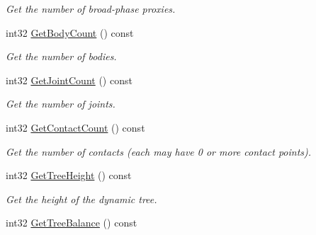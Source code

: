 \begin{DoxyCompactItemize}
\begin{DoxyCompactList}\small\item\em Get the number of broad-\/phase proxies. \end{DoxyCompactList}\item 
int32 \hyperlink{classb2_world_a4559122ea51401b4fb7342eb6232ce74}{Get\+Body\+Count} () const \hypertarget{classb2_world_a4559122ea51401b4fb7342eb6232ce74}{}\label{classb2_world_a4559122ea51401b4fb7342eb6232ce74}

\begin{DoxyCompactList}\small\item\em Get the number of bodies. \end{DoxyCompactList}\item 
int32 \hyperlink{classb2_world_a54a95a98787ed5f383c6549ee1f4c4d5}{Get\+Joint\+Count} () const \hypertarget{classb2_world_a54a95a98787ed5f383c6549ee1f4c4d5}{}\label{classb2_world_a54a95a98787ed5f383c6549ee1f4c4d5}

\begin{DoxyCompactList}\small\item\em Get the number of joints. \end{DoxyCompactList}\item 
int32 \hyperlink{classb2_world_abcc976f1755f9bb94a8650f5f4219a8d}{Get\+Contact\+Count} () const \hypertarget{classb2_world_abcc976f1755f9bb94a8650f5f4219a8d}{}\label{classb2_world_abcc976f1755f9bb94a8650f5f4219a8d}

\begin{DoxyCompactList}\small\item\em Get the number of contacts (each may have 0 or more contact points). \end{DoxyCompactList}\item 
int32 \hyperlink{classb2_world_a48f90a31dc2ad30dbc50cac5111400d7}{Get\+Tree\+Height} () const \hypertarget{classb2_world_a48f90a31dc2ad30dbc50cac5111400d7}{}\label{classb2_world_a48f90a31dc2ad30dbc50cac5111400d7}

\begin{DoxyCompactList}\small\item\em Get the height of the dynamic tree. \end{DoxyCompactList}\item 
int32 \hyperlink{classb2_world_a9fb7c28d042b600ba1155e3d38f1c5f9}{Get\+Tree\+Balance} () const \hypertarget{classb2_world_a9fb7c28d042b600ba1155e3d38f1c5f9}{}\label{classb2_world_a9fb7c28d042b600ba1155e3d38f1c5f9}


\end{DoxyCompactItemize}
